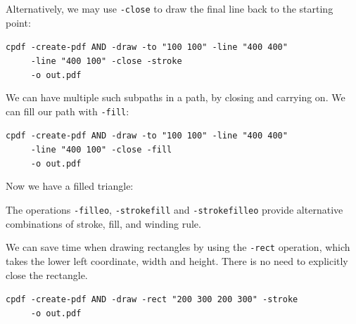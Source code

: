\documentclass{book}
\begin{document}
\noindent Alternatively, we may use \texttt{-close} to draw the final line back to the starting point:

\begin{framed}
 \noindent\small\verb?cpdf -create-pdf AND -draw -to "100 100" -line "400 400"?\\
 \noindent\small\verb?     -line "400 100" -close -stroke?\\
 \noindent\small\verb?     -o out.pdf?
\end{framed}

\noindent We can have multiple such subpaths in a path, by closing and carrying on. We can fill our path with \texttt{-fill}:

\begin{framed}
 \noindent\small\verb?cpdf -create-pdf AND -draw -to "100 100" -line "400 400"?\\
 \noindent\small\verb?     -line "400 100" -close -fill?\\
 \noindent\small\verb?     -o out.pdf?
\end{framed}

\noindent Now we have a filled triangle:

\bigskip
{}
\bigskip

\noindent The operations \texttt{-filleo}, \texttt{-strokefill} and \texttt{-strokefilleo} provide alternative combinations of stroke, fill, and winding rule.

We can save time when drawing rectangles by using the \texttt{-rect} operation, which takes the lower left coordinate, width and height. There is no need to explicitly close the rectangle.

\begin{framed}
 \noindent\small\verb?cpdf -create-pdf AND -draw -rect "200 300 200 300" -stroke?\\
 \noindent\small\verb?     -o out.pdf?
\end{framed}
\end{document}
